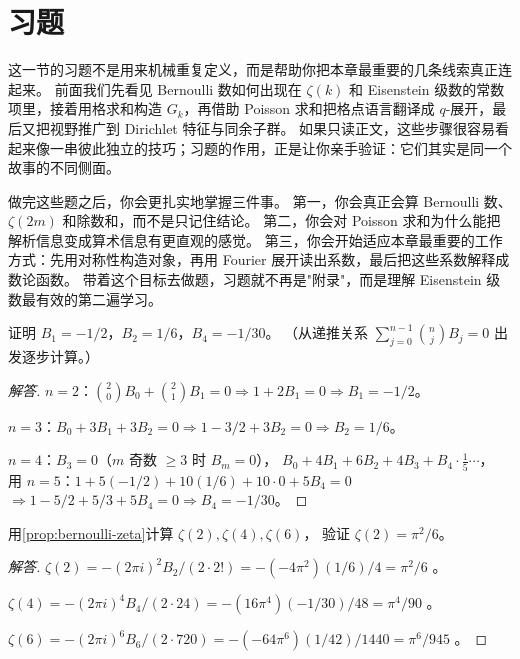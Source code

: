 \section{习题}
\label{sec:eisenstein-exercises}

这一节的习题不是用来机械重复定义，而是帮助你把本章最重要的几条线索真正连起来。
前面我们先看见 Bernoulli 数如何出现在 $\zeta(k)$ 和 Eisenstein 级数的常数项里，接着用格求和构造 $G_k$，再借助 Poisson 求和把格点语言翻译成 $q$-展开，最后又把视野推广到 Dirichlet 特征与同余子群。
如果只读正文，这些步骤很容易看起来像一串彼此独立的技巧；习题的作用，正是让你亲手验证：它们其实是同一个故事的不同侧面。

做完这些题之后，你会更扎实地掌握三件事。
第一，你会真正会算 Bernoulli 数、$\zeta(2m)$ 和除数和，而不是只记住结论。
第二，你会对 Poisson 求和为什么能把解析信息变成算术信息有更直观的感觉。
第三，你会开始适应本章最重要的工作方式：先用对称性构造对象，再用 Fourier 展开读出系数，最后把这些系数解释成数论函数。
带着这个目标去做题，习题就不再是"附录"，而是理解 Eisenstein 级数最有效的第二遍学习。

\begin{exercise}
\label{ex:ch2-bernoulli-1}
证明 $B_1 = -1/2$，$B_2 = 1/6$，$B_4 = -1/30$。
（从递推关系 $\sum_{j=0}^{n-1}\binom{n}{j}B_j = 0$ 出发逐步计算。）
\end{exercise}

\begin{proof}[解答]
$n=2$：$\binom{2}{0}B_0 + \binom{2}{1}B_1 = 0 \Rightarrow 1 + 2B_1 = 0 \Rightarrow B_1 = -1/2$。

$n=3$：$B_0 + 3B_1 + 3B_2 = 0 \Rightarrow 1 - 3/2 + 3B_2 = 0 \Rightarrow B_2 = 1/6$。

$n=4$：$B_3 = 0$（$m$ 奇数 $\geq 3$ 时 $B_m = 0$），
$B_0 + 4B_1 + 6B_2 + 4B_3 + B_4 \cdot \frac{1}{5}\cdots$，
用 $n=5$：$1 + 5(-1/2) + 10(1/6) + 10 \cdot 0 + 5B_4 = 0$
$\Rightarrow 1 - 5/2 + 5/3 + 5B_4 = 0 \Rightarrow B_4 = -1/30$。
\end{proof}

\begin{exercise}
\label{ex:ch2-zeta-2}
用\cref{prop:bernoulli-zeta}计算 $\zeta(2), \zeta(4), \zeta(6)$，
验证 $\zeta(2) = \pi^2/6$。
\end{exercise}

\begin{proof}[解答]
$\zeta(2) = -(2\pi i)^2 B_2 / (2 \cdot 2!) = -(-4\pi^2)(1/6)/4 = \pi^2/6$ \checkmark。

$\zeta(4) = -(2\pi i)^4 B_4/(2 \cdot 24) = -(16\pi^4)(-1/30)/48 = \pi^4/90$ \checkmark。

$\zeta(6) = -(2\pi i)^6 B_6/(2 \cdot 720) = -(-64\pi^6)(1/42)/1440 = \pi^6/945$ \checkmark。
\end{proof}

